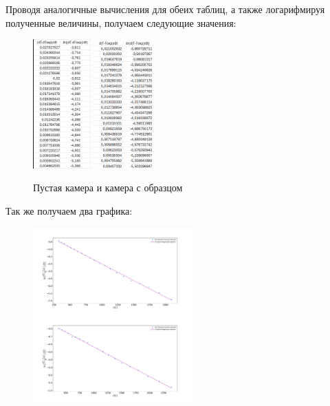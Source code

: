 \documentclass[a4paper]{article}
\begin{document}
Проводя аналогичные вычисления для обеих таблиц, а также логарифмируя полученные величины, получаем следующие значения:


\begin{figure}[H]
\begin{center}
\includegraphics[width=0.2\textwidth]{3}
\includegraphics[width=0.2\textwidth]{4}
\caption{Пустая камера и камера с образцом}
\end{center}
\end{figure}

Так же получаем два графика:
\begin{figure}[H]
\begin{center}
\includegraphics[width=0.55\textwidth]{gra_c_log.pdf}
\includegraphics[width=0.55\textwidth]{gra_c_c_log.pdf}
\end{center}
\end{figure}
\end{document}
